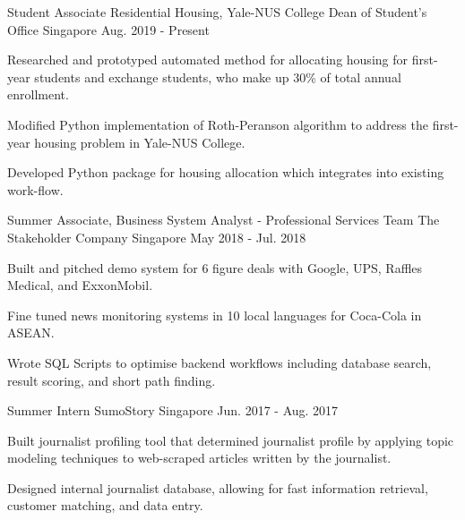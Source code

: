 

\begin{cventries}

  \cventry
  {Student Associate}
  {Residential Housing, Yale-NUS College Dean of Student's Office}
  {Singapore}
  {Aug. 2019 - Present}
  {
    \begin{cvitems}
    \item {Researched and prototyped automated method for allocating housing for
        first-year students and exchange students, who make up 30\% of total
        annual enrollment.}
    \item {Modified Python implementation of Roth-Peranson algorithm to address
        the first-year housing problem in Yale-NUS College.}
    \item {Developed Python package for housing allocation which integrates into
        existing work-flow.}
    \end{cvitems}
  }

  \cventry
  {Summer Associate, Business System Analyst - Professional Services Team} %
  {The Stakeholder Company} %
  {Singapore} %
  {May 2018 - Jul. 2018} %
  {
    \begin{cvitems} %
    \item {Built and pitched demo system for 6 figure deals with Google, UPS,
        Raffles Medical, and ExxonMobil.}
    \item {Fine tuned news monitoring systems in 10 local languages for
        Coca-Cola in ASEAN.}
    \item {Wrote SQL Scripts to optimise backend workflows including database
        search, result scoring, and short path finding.}
    \end{cvitems}
  }
    
  \cventry
  {Summer Intern} %
  {SumoStory} %
  {Singapore} %
  {Jun. 2017 - Aug. 2017} %
  {
    \begin{cvitems} %
    \item {Built journalist profiling tool that determined journalist profile by
      applying topic modeling techniques to web-scraped articles written by the
      journalist.}
    \item {Designed internal journalist database, allowing for fast information
        retrieval, customer matching, and data entry.}
    \end{cvitems}
  }

\end{cventries}
